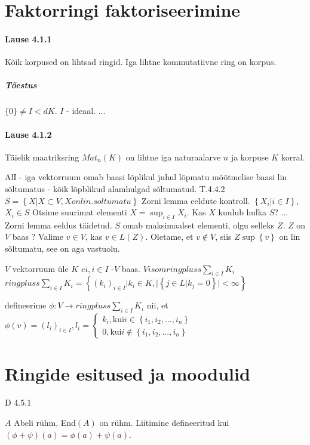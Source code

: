 \documentclass[12pt]{report}
\numberwithin{equation}{section}
\theoremstyle{definition}
\theoremstyle{plain}
\begin{document}
\section{Faktorringi faktoriseerimine}

\paragraph{Lause 4.1.1} Kõik korpused on lihtsad ringid. Iga lihtne kommutatiivne ring on korpus. 

\subparagraph{Tõestus} $\{0\} \neq I <d K$. $I$ - ideaal. ...

\paragraph{Lause 4.1.2} Täielik maatriksring $Mat_n (K)$ on lihtne iga naturaalarve $n$ ja korpuse $K$ korral. 


AlI - iga vektorruum omab baasi lõplikul juhul
lõpmatu mõõtmelise baasi lin sõltumatus - kõik lõpblikud alamhulgad sõltumatud.
T.4.4.2
$S = \left\{ X | X \subset V, X on lin. soltumatu \right\}$
Zorni lemma eeldute kontroll.
$\left\{ X_i | i \in I \right\}$, $X_i \in S$ Otsime suurimat elementi
$X = \sup_{i \in I} X_i$. Kas $X$ kuulub hulka $S$?
...
Zorni lemma eeldus täidetud.
$S$ omab maksimaalset elementi, olgu selleks $Z$. $Z$ on $V$ baas ? 
Valime $v \in V$, kas $v \in L(Z)$. Oletame, et $v \not \in V$, siis $Z \sup \left\{ v \right\}$ on lin sõltumatu, see on aga vastuolu.

$V$ vektorruum \"ule $K$
$ei, i \in I$ -$V$ baas.
$V isom ringpluss \sum \limits_{i \in I} K_i$
$ringpluss \sum \limits_{i \in I} K_i = \left\{ (k_i)_{i \in I} | k_i \in K, | \left\{ j \in L | k_j = 0 \right\} | < \infty \right\}$

defineerime $\phi: V \to ringpluss \sum \limits_{i \in I} K_i$ nii, et $\phi(v) = (l_i)_{i \in I}, l_i = \begin{cases} k_i, \text{kui} i \in \left\{ i_1,i_2,...,i_n \right\} \\
0, \text{kui} i \not \in \left\{ i_1,i_2,...,i_n \right\}
\end{cases}$

\section{Ringide esitused ja moodulid}
D 4.5.1

$A$ Abeli r\"uhm, End$(A)$ on r\"uhm. Liitimine defineeritud kui $\left( \phi + \psi \right) \left( a \right) = \phi \left( a \right) + \psi \left( a \right)$. 
\end{document}
